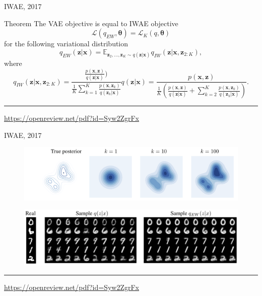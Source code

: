 \documentclass{beamer}
\newcommand{\bx}{\mathbf{x}}
\newcommand{\bz}{\mathbf{z}}
\newcommand{\btheta}{\boldsymbol{\theta}}
\begin{document}
\begin{frame}{IWAE, 2017}
\begin{block}{Theorem}
The VAE objective is equal to IWAE objective 
\[
    \mathcal{L}(q_{EW}, \btheta) = \mathcal{L}_K(q, \btheta)
\]
for the following variational distribution
\[
    q_{EW}(\bz | \bx) = \mathbb{E}_{\bz_2, \dots, \bz_K \sim q(\bz | \bx)} q_{IW}(\bz | \bx, \bz_{2:K}),
\]
where \[
    q_{IW}(\bz | \bx, \bz_{2:K}) = \frac{\frac{p(\bx, \bz)}{q(\bz | \bx)})}{\frac{1}{K} \sum_{k=1}^K \frac{p(\bx, \bz_k)}{q(\bz_k | \bx)}} q(\bz | \bx) = \frac{p(\bx, \bz)}{\frac{1}{K}\left( \frac{p(\bx, \bz)}{q(\bz | \bx)} + \sum_{k=2}^K \frac{p(\bx, \bz_k)}{q(\bz_k | \bx)}\right)}.
\]
\end{block}

\vfill
\hrule\medskip
{\scriptsize \href{https://openreview.net/pdf?id=Syw2ZgrFx}{https://openreview.net/pdf?id=Syw2ZgrFx}}
\end{frame}
\begin{frame}{IWAE, 2017}
    \begin{figure}
        \centering
        \includegraphics[width=\linewidth]{figs/IWAE_1.png}
    \end{figure}
    \begin{figure}
        \centering
        \includegraphics[width=\linewidth]{figs/IWAE_2.png}
    \end{figure}

\vfill
\hrule\medskip
{\scriptsize \href{https://openreview.net/pdf?id=Syw2ZgrFx}{https://openreview.net/pdf?id=Syw2ZgrFx}}
\end{frame}
\end{document}
